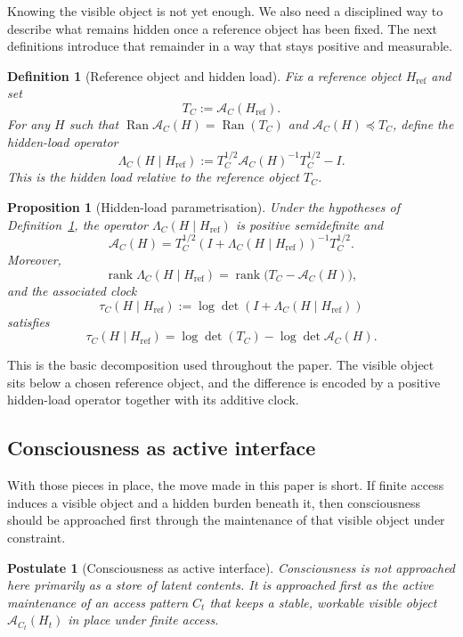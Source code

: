 \documentclass[11pt,a4paper]{article}
\numberwithin{equation}{section}
\DeclareMathOperator{\Ran}{Ran}
\DeclareMathOperator{\rank}{rank}
\newcommand{\Aobs}{\mathcal A}
\theoremstyle{thmcompact}
\newtheorem{proposition}[theorem]{Proposition}
\newtheorem{definition}[theorem]{Definition}
\newtheorem{postulate}[theorem]{Postulate}
\theoremstyle{remark}
\begin{document}
Knowing the visible object is not yet enough. We also need a disciplined way to describe what remains hidden once a reference object has been fixed. The next definitions introduce that remainder in a way that stays positive and measurable.

\begin{definition}[Reference object and hidden load]
\label{def:latent-return}
Fix a reference object \(H_{\mathrm{ref}}\) and set
\[
T_C:=\Aobs_C(H_{\mathrm{ref}}).
\]
For any \(H\) such that \(\Ran \Aobs_C(H)=\Ran(T_C)\) and \(\Aobs_C(H)\preceq T_C\), define the hidden-load operator
\[
\Lambda_C(H\mid H_{\mathrm{ref}})
:=
T_C^{1/2}\Aobs_C(H)^{-1}T_C^{1/2}-I.
\]
This is the hidden load relative to the reference object \(T_C\).
\end{definition}

\begin{proposition}[Hidden-load parametrisation]
\label{prop:hidden-load}
Under the hypotheses of Definition~\ref{def:latent-return}, the operator \(\Lambda_C(H\mid H_{\mathrm{ref}})\) is positive semidefinite and
\[
\Aobs_C(H)=T_C^{1/2}(I+\Lambda_C(H\mid H_{\mathrm{ref}}))^{-1}T_C^{1/2}.
\]
Moreover,
\[
\rank \Lambda_C(H\mid H_{\mathrm{ref}})=\rank\bigl(T_C-\Aobs_C(H)\bigr),
\]
and the associated clock
\[
\tau_C(H\mid H_{\mathrm{ref}}):=\log\det(I+\Lambda_C(H\mid H_{\mathrm{ref}}))
\]
satisfies
\[
\tau_C(H\mid H_{\mathrm{ref}})=\log\det(T_C)-\log\det \Aobs_C(H).
\]
\end{proposition}

This is the basic decomposition used throughout the paper. The visible object sits below a chosen reference object, and the difference is encoded by a positive hidden-load operator together with its additive clock.

\subsection{Consciousness as active interface}

With those pieces in place, the move made in this paper is short. If finite access induces a visible object and a hidden burden beneath it, then consciousness should be approached first through the maintenance of that visible object under constraint.

\begin{postulate}[Consciousness as active interface]
\label{post:active-interface}
Consciousness is not approached here primarily as a store of latent contents. It is approached first as the active maintenance of an access pattern \(C_t\) that keeps a stable, workable visible object \(\Aobs_{C_t}(H_t)\) in place under finite access.
\end{postulate}
\end{document}
